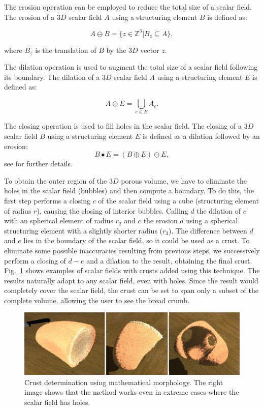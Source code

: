 The erosion operation can be employed to reduce the total size of a scalar field.
The erosion of a $3D$ scalar field $A$ using a structuring element $B$ is defined as:

\begin{equation}
A \ominus B = \{z\in \mathbb{Z}^3 | B_{z} \subseteq A\},
\end{equation}

\noindent where $B_{z}$ is the translation of $B$ by the $3D$ vector $z$.

The dilation operation is used to augment the total size of a scalar field following its boundary.
The dilation of a $3D$ scalar field $A$ using a structuring element $E$ is defined as:

\begin{equation}
A  \oplus E = \bigcup_{e\in E} A_e.
\end{equation}

The closing operation is used to fill holes in the scalar field.
The closing of a $3D$ scalar field $B$ using a structuring element $E$ is defined as a dilation followed by an erosion:
\begin{equation}
B \bullet E = (B \oplus E) \ominus E,
\end{equation}
see \cite{Gonzalez2001} for further details.

To obtain the outer region of the $3D$ porous volume, we have to eliminate the holes in the scalar field (bubbles) and then compute a boundary.
To do this, the first step performs a closing $c$ of the scalar field using a cube (structuring element of radius $r$), causing the closing of interior bubbles.
Calling $d$ the dilation of $c$ with an spherical element of radius $r_{2}$ and $e$ the erosion $d$ using a spherical structuring element with a slightly shorter radius ($r_{3}$).
The difference between $d$ and $e$ lies in the boundary of the scalar field, so it could be used as a crust.
To eliminate some possible inaccuracies resulting from previous steps, we successively perform a closing of $d-e$ and a dilation to the result, obtaining the final crust.
Fig.~\ref{fg:crusts} shows examples of scalar fields with crusts added using this technique. The results naturally adapt to any scalar field, even with holes.
Since the result would completely cover the scalar field, the crust can be set to span only a subset of the complete volume, allowing the user to see the bread crumb.


\begin{figure}
  \centerline{\includegraphics[width=13cm]{figures/crusts}}
  \caption{Crust determination using mathematical morphology. The right image shows that the method works even in extreme cases where the scalar field has holes. }
  \label{fg:crusts}
\end{figure}

